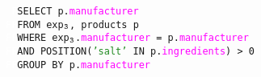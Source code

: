 \newcommand{\sqlcolor}[1]{\textcolor{Bittersweet}{#1}}
\newcommand{\fieldcolor}[1]{\textcolor{Fuchsia}{#1}}
\newcommand{\strcolor}[1]{\textcolor{ForestGreen}{#1}}
\newcommand{\numcolor}[1]{\textcolor{TealBlue}{#1}}

\begin{figure}[h]
    \texttt{
    \textcolor{white}{F}\sqlcolor{SELECT} p.\fieldcolor{manufacturer} \\
    \textcolor{white}{FF}\sqlcolor{FROM} exp$\sb\texttt{3}$, products p\\
    \textcolor{white}{FF}\sqlcolor{WHERE} exp$\sb\texttt{3}$.\fieldcolor{manufacturer} = p.\fieldcolor{manufacturer} \\ 
    \textcolor{white}{FF}\sqlcolor{AND POSITION}(\strcolor{'salt'} \sqlcolor{IN} p.\fieldcolor{ingredients}) > \numcolor{0} \\
    \textcolor{white}{FF}\sqlcolor{GROUP BY} p.\fieldcolor{manufacturer}
    }
\end{figure}
